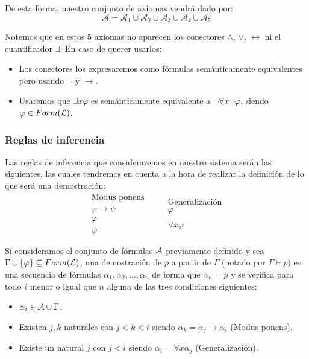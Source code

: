 De esta forma, nuestro conjunto de axiomas vendrá dado por:
\begin{equation*}
    \mathcal{A} = \mathcal{A}_1 \cup \mathcal{A}_2 \cup \mathcal{A}_3 \cup \mathcal{A}_4 \cup \mathcal{A}_5
\end{equation*}

Notemos que en estos 5 axiomas no aparecen los conectores $\land$, $\lor$, $\leftrightarrow $ ni el cuantificador $\exists $. En caso de querer usarlos:
\begin{itemize}
    \item Los conectores los expresaremos como fórmulas semánticamente equivalentes pero usando $\lnot$ y $\to$.
    \item Usaremos que $\exists x\varphi$ es semánticamente equivalente a $\lnot\forall x\lnot\varphi$, siendo $\varphi \in Form(\mathcal{L})$.
\end{itemize}

\subsubsection{Reglas de inferencia}
Las reglas de inferencia que consideraremos en nuestro sistema serán las siguientes, las cuales tendremos en cuenta a la hora de realizar la definición de lo que será una demostración:
\begin{equation*}
    \begin{array}{l}
        \text{Modus ponens} \\
        \varphi\to \psi \\
        \varphi \\
        \hline
        \psi 
    \end{array} \qquad \begin{array}{l}
        \text{Generalización}\\
        \varphi \\
        \ \\
        \hline
        \forall x\varphi 
    \end{array}
\end{equation*}

\begin{definicion}[Demostración]
    Si consideramos el conjunto de fórmulas $\mathcal{A}$ previamente definido y sea $\Gamma\cup\{\varphi\} \subseteq Form(\mathcal{L})$, una demostración de $p$ a partir de $\Gamma$ (notado por $\Gamma\vdash p$) es una secuencia de fórmulas $\alpha_1,\alpha_2,\ldots,\alpha_n$ de forma que $\alpha_n = p$ y se verifica para todo $i$ menor o igual que $n$ alguna de las tres condiciones siguientes:
    \begin{itemize}
        \item $\alpha_i \in \mathcal{A}\cup \Gamma$.
        \item Existen $j,k$ naturales con $j<k<i$ siendo $\alpha_k = \alpha_j \to \alpha_i$ (Modus ponens).
        \item Existe un natural $j$ con $j<i$ siendo $\alpha_i = \forall x\alpha_j$ (Generalización).
    \end{itemize}
\end{definicion}

